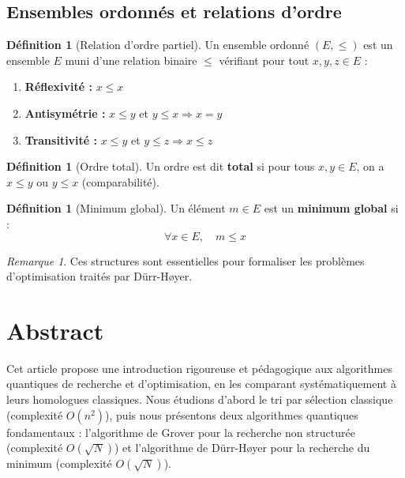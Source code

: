 \documentclass[12pt,a4paper]{article}
\theoremstyle{definition}
\newtheorem{definition}[theorem]{Définition}
\theoremstyle{remark}
\newtheorem{remark}[theorem]{Remarque}
\begin{document}
\subsection{Ensembles ordonnés et relations d'ordre}

\begin{definition}[Relation d'ordre partiel]
Un ensemble ordonné $(E, \leq)$ est un ensemble $E$ muni d'une relation binaire $\leq$ vérifiant pour tout $x, y, z \in E$ :
\begin{enumerate}
    \item \textbf{Réflexivité :} $x \leq x$
    \item \textbf{Antisymétrie :} $x \leq y$ et $y \leq x \Rightarrow x = y$
    \item \textbf{Transitivité :} $x \leq y$ et $y \leq z \Rightarrow x \leq z$
\end{enumerate}
\end{definition}

\begin{definition}[Ordre total]
Un ordre est dit \textbf{total} si pour tous $x, y \in E$, on a $x \leq y$ ou $y \leq x$ (comparabilité).
\end{definition}

\begin{definition}[Minimum global]
Un élément $m \in E$ est un \textbf{minimum global} si :
\[
\forall x \in E, \quad m \leq x
\]
\end{definition}

\begin{remark}
Ces structures sont essentielles pour formaliser les problèmes d'optimisation traités par Dürr-Høyer.
\end{remark}

\newpage

\section{Abstract}

Cet article propose une introduction rigoureuse et pédagogique aux algorithmes quantiques de recherche et d'optimisation, en les comparant systématiquement à leurs homologues classiques. Nous étudions d'abord le tri par sélection classique (complexité $O(n^2)$), puis nous présentons deux algorithmes quantiques fondamentaux : l'algorithme de Grover pour la recherche non structurée (complexité $O(\sqrt{N})$) et l'algorithme de Dürr-Høyer pour la recherche du minimum (complexité $O(\sqrt{N})$).
\end{document}
